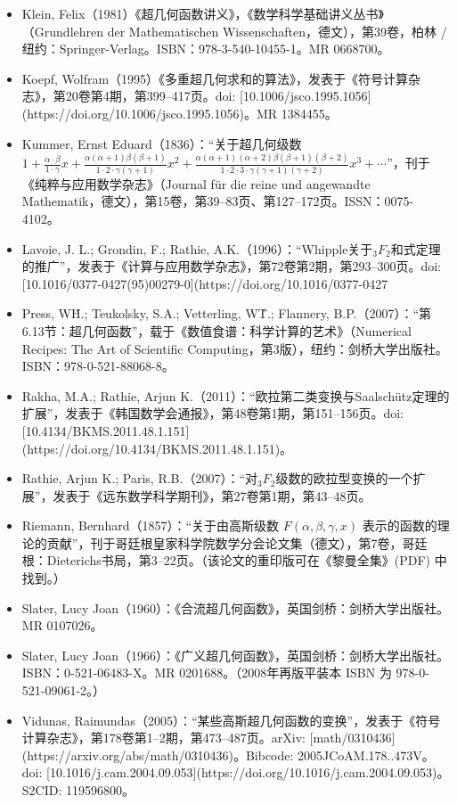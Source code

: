 \begin{itemize}
\item Klein, Felix（1981）《超几何函数讲义》，《数学科学基础讲义丛书》（Grundlehren der Mathematischen Wissenschaften，德文），第39卷，柏林 / 纽约：Springer-Verlag。ISBN：978-3-540-10455-1。MR 0668700。
\item Koepf, Wolfram（1995）《多重超几何求和的算法》，发表于《符号计算杂志》，第20卷第4期，第399–417页。doi: [10.1006/jsco.1995.1056](https://doi.org/10.1006/jsco.1995.1056)。MR 1384455。
\item Kummer, Ernst Eduard（1836）：“关于超几何级数
$1 + \frac{\alpha \cdot \beta}{1 \cdot \gamma}x + \frac{\alpha(\alpha + 1)\beta(\beta + 1)}{1 \cdot 2 \cdot \gamma(\gamma + 1)}x^2 + \frac{\alpha(\alpha + 1)(\alpha + 2)\beta(\beta + 1)(\beta + 2)}{1 \cdot 2 \cdot 3 \cdot \gamma(\gamma + 1)(\gamma + 2)}x^3 + \cdots$”，刊于《纯粹与应用数学杂志》（Journal für die reine und angewandte Mathematik，德文），第15卷，第39–83页、第127–172页。ISSN：0075-4102。
\item Lavoie, J. L.; Grondin, F.; Rathie, A.K.（1996）：“Whipple关于$_3F_2$和式定理的推广”，发表于《计算与应用数学杂志》，第72卷第2期，第293–300页。doi: [10.1016/0377-0427(95)00279-0](https://doi.org/10.1016/0377-0427%
\item Press, W\.H.; Teukolsky, S.A.; Vetterling, W\.T.; Flannery, B.P.（2007）：“第6.13节：超几何函数”，载于《数值食谱：科学计算的艺术》（Numerical Recipes: The Art of Scientific Computing，第3版），纽约：剑桥大学出版社。ISBN：978-0-521-88068-8。
\item Rakha, M.A.; Rathie, Arjun K.（2011）：“欧拉第二类变换与Saalschütz定理的扩展”，发表于《韩国数学会通报》，第48卷第1期，第151–156页。doi: [10.4134/BKMS.2011.48.1.151](https://doi.org/10.4134/BKMS.2011.48.1.151)。
\item Rathie, Arjun K.; Paris, R.B.（2007）：“对$_3F_2$级数的欧拉型变换的一个扩展”，发表于《远东数学科学期刊》，第27卷第1期，第43–48页。
\item Riemann, Bernhard（1857）：“关于由高斯级数 $F(\alpha, \beta, 
\gamma, x)$ 表示的函数的理论的贡献”，刊于哥廷根皇家科学院数学分会论文集（德文），第7卷，哥廷根：Dieterichs书局，第3–22页。（该论文的重印版可在《黎曼全集》(PDF) 中找到。）
\item Slater, Lucy Joan（1960）：《合流超几何函数》，英国剑桥：剑桥大学出版社。MR 0107026。
\item Slater, Lucy Joan（1966）：《广义超几何函数》，英国剑桥：剑桥大学出版社。ISBN：0-521-06483-X。MR 0201688。（2008年再版平装本 ISBN 为 978-0-521-09061-2。）
\item Vidunas, Raimundas（2005）：“某些高斯超几何函数的变换”，发表于《符号计算杂志》，第178卷第1–2期，第473–487页。arXiv: [math/0310436](https://arxiv.org/abs/math/0310436)。Bibcode: 2005JCoAM.178..473V。doi: [10.1016/j.cam.2004.09.053](https://doi.org/10.1016/j.cam.2004.09.053)。S2CID: 119596800。

\end{itemize}
